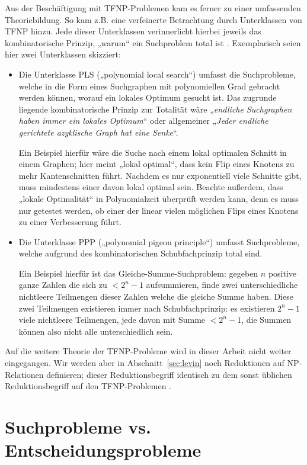 Aus der Beschäftigung mit TFNP-Problemen kam es ferner zu einer umfassenden Theoriebildung. So kam z.B. eine verfeinerte Betrachtung durch Unterklassen von TFNP hinzu. Jede dieser Unterklassen verinnerlicht hierbei jeweils das kombinatorische Prinzip, „warum“ ein Suchproblem total ist \parencite[vgl. den Überblick von][]{goldberg_towards_2018}. Exemplarisch seien hier zwei Unterklassen skizziert:
\begin{itemize}
    \item Die Unterklasse PLS („polynomial local search“) umfasst die Suchprobleme, welche in die Form eines Suchgraphen mit polynomiellen Grad gebracht werden können, worauf ein lokales Optimum gesucht ist.
        Das zugrunde liegende kombinatorische Prinzip zur Totalität wäre „\emph{endliche Suchgraphen haben immer ein lokales Optimum}“ oder allgemeiner „\emph{Jeder endliche gerichtete azyklische Graph hat eine Senke}“.

        Ein Beispiel hierfür wäre die Suche nach einem lokal optimalen Schnitt in einem Graphen; hier meint „lokal optimal“, dass kein Flip eines Knotens zu mehr Kantenschnitten führt. Nachdem es nur exponentiell viele Schnitte gibt, muss mindestens einer davon lokal optimal sein. Beachte außerdem, dass „lokale Optimalität“ in Polynomialzeit überprüft werden kann, denn es muss nur getestet werden, ob einer der linear vielen möglichen Flips eines Knotens zu einer Verbesserung führt.

    \item Die Unterklasse PPP („polynomial pigeon principle“) umfasst Suchprobleme, welche aufgrund des kombinatorischen Schubfachprinzip total sind. 

        Ein Beispiel hierfür ist das Gleiche-Summe-Suchproblem: gegeben $n$ positive ganze Zahlen die sich zu $<2^n-1$ aufsummieren, finde zwei unterschiedliche nichtleere Teilmengen dieser Zahlen welche die gleiche Summe haben. Diese zwei Teilmengen existieren immer nach Schubfachprinzip: es existieren $2^n-1$ viele nichtleere Teilmengen, jede davon mit Summe $<2^n-1$, die Summen können also nicht alle unterschiedlich sein.
\end{itemize}
Auf die weitere Theorie der TFNP-Probleme wird in dieser Arbeit nicht weiter eingegangen. Wir werden aber in Abschnitt~\ref{sec:levin} noch Reduktionen auf NP-Relationen definieren; dieser Reduktionsbegriff identisch zu dem sonst üblichen Reduktionsbegriff auf den TFNP-Problemen \parencite{megiddo_total_1991}.


\section{Suchprobleme vs. Entscheidungsprobleme}\label{sec:search-vs-decision}

